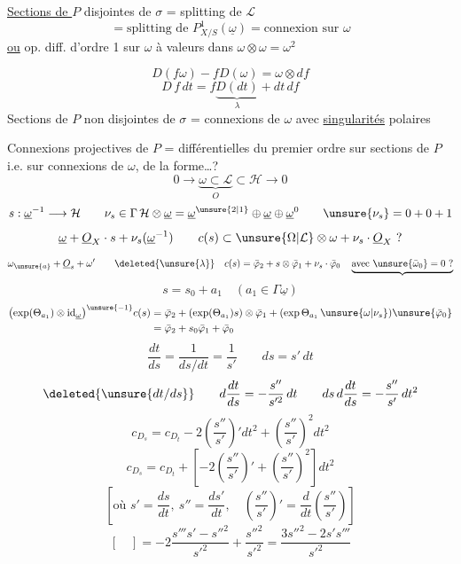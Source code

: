 \uline{Sections de $P$} disjointes de $\sigma$ = splitting de $\mathcal L$
\[
=\text{splitting de }P^1_{X/S}(\underline\omega)
=\text{connexion sur }\omega
\]
\uline{ou} op. diff. d'ordre 1 sur $\omega$ à valeurs dans $\omega\otimes\omega=\omega^2$

\[
D(f\omega)-fD(\omega)=\omega\otimes df
\]
\[
D\,f\,dt=f\underbrace{D(dt)}_{\lambda}+dt\,df
\]
Sections de $P$ non disjointes de $\sigma$ = connexions de $\omega$ avec  \uline{singularités} polaires

Connexions projectives de $P$ =  différentielles du premier ordre sur sections de $P$ i.e. sur connexions de $\omega$, de la forme\ldots ?
\[
0\longrightarrow\underbrace{\omega\subset\mathcal L}_{O}\subset\mathcal H\longrightarrow0
\]
\[
s:\underline\omega^{-1}\longrightarrow\mathcal H
\qquad
\nu_s\in\Gamma\,\mathcal H\otimes\underline\omega
=\underline\omega^{\unsure{2|1}}\oplus\underline\omega\oplus\underline\omega^0
\qquad\unsure{\nu_s}=0+0+1
\]
\[
\underline\omega+\underline O_X\cdot s+\nu_s(\underline\omega^{-1})
\qquad c(s)\subset\unsure{\Omega|\mathcal L}\otimes\omega+\nu_s\cdot\underline O_X\ ?
\]
\[
\omega_{\unsure{a}}+\underline O_s+\omega'
\qquad \deleted{\unsure{\lambda}}\quad
c(s)=\bar\varphi_2+s\otimes\bar\varphi_1+\nu_s\cdot\bar\varphi_0
\quad\underbrace{\text{avec }\unsure{\bar\omega_0}=0\ ?}
\]
\[
s=s_0+a_1\quad(a_1\in\Gamma\underline\omega)
\]
\[
\begin{aligned}
\bigl(\exp(\Theta_{a_1})\otimes\mathrm{id}_{\underline\omega}\bigr)^{\unsure{-1}}c(s)
&=\bar\varphi_2+(\exp(\Theta_{a_1})s)\otimes\bar\varphi_1
 +(\exp\Theta_{a_1}\,\unsure{\omega|\nu_s})\unsure{\bar\varphi_0}\\
&=\bar\varphi_2+s_0\bar\varphi_1+\bar\varphi_0
\end{aligned}
\]
\[
\frac{dt}{ds}=\frac1{ds/dt}=\frac1{s'}\qquad ds=s'\,dt
\]
\[
\deleted{\unsure{dt/ds}}\qquad d\frac{dt}{ds}=-\frac{s''}{s'^2}\,dt
\qquad ds\,d\frac{dt}{ds}=-\frac{s''}{s'}\,dt^2
\]
\[
c_{D_s}=c_{D_t}-2\left(\frac{s''}{s'}\right)'dt^2+\left(\frac{s''}{s'}\right)^2dt^2
\]
\[
\boxed{c_{D_s}=c_{D_t}+\left[-2\left(\frac{s''}{s'}\right)'+\left(\frac{s''}{s'}\right)^2\right]dt^2}
\]
\[
\left[\text{où }s'=\frac{ds}{dt},\ s''=\frac{ds'}{dt},\quad
\left(\frac{s''}{s'}\right)'=\frac d{dt}\left(\frac{s''}{s'}\right)\right]
\]
\[
[\quad]=-2\frac{s'''s'-s''^2}{s'^2}+\frac{s''^2}{s'^2}
=\frac{3s''^2-2s's'''}{s'^2}
\]
